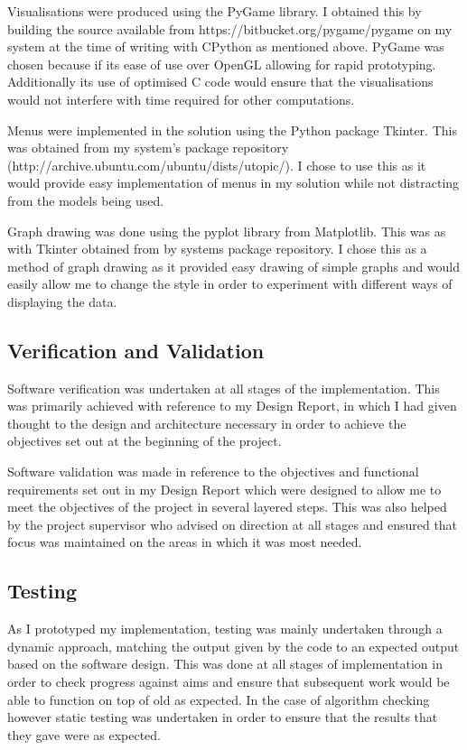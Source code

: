 \documentclass[12pt,a4paper]{article}
\begin{document}
Visualisations were produced using the PyGame library. I obtained this by building the source available from https://bitbucket.org/pygame/pygame on my system at the time of writing with CPython as mentioned above. PyGame was chosen because if its ease of use over OpenGL allowing for rapid prototyping. Additionally its use of optimised C code would ensure that the visualisations would not interfere with time required for other computations.

Menus were implemented in the solution using the Python package Tkinter. This was obtained from my system's package repository (http://archive.ubuntu.com/ubuntu/dists/utopic/). I chose to use this as it would provide easy implementation of menus in my solution while not distracting from the models being used.

Graph drawing was done using the pyplot library from Matplotlib. This was as with Tkinter obtained from by systems package repository. I chose this as a method of graph drawing as it provided easy drawing of simple graphs and would easily allow me to change the style in order to experiment with different ways of displaying the data.

\subsection{Verification and Validation}

Software verification was undertaken at all stages of the implementation. This was primarily achieved with reference to my Design Report, in which I had given thought to the design and architecture necessary in order to achieve the objectives set out at the beginning of the project.

Software validation was made in reference to the objectives and functional requirements set out in my Design Report which were designed to allow me to meet the objectives of the project in several layered steps. This was also helped by the project supervisor who advised on direction at all stages and ensured that focus was maintained on the areas in which it was most needed.

\subsection{Testing}

As I prototyped my implementation, testing was mainly undertaken through a dynamic approach, matching the output given by the code to an expected output based on the software design. This was done at all stages of implementation in order to check progress against aims and ensure that subsequent work would be able to function on top of old as expected. In the case of algorithm checking however static testing was undertaken in order to ensure that the results that they gave were as expected.
\end{document}
